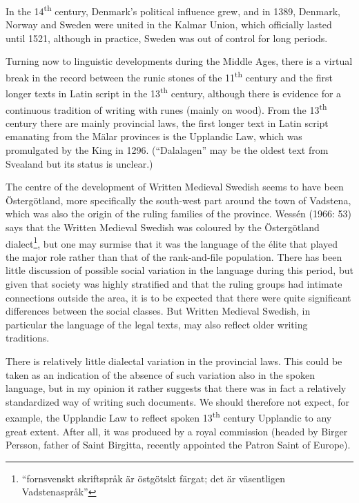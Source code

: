 In the 14\textsuperscript{th} century, Denmark’s political influence grew, and in 1389, Denmark, Norway and Sweden were united in the Kalmar Union, which officially lasted until 1521, although in practice, Sweden was out of control for long periods. 

Turning now to linguistic developments during the Middle Ages, there is a virtual break in the record between the runic stones of the 11\textsuperscript{th} century and the first longer texts in Latin script in the 13\textsuperscript{th} century, although there is evidence for a continuous tradition of writing with runes (mainly on wood). From the 13\textsuperscript{th} century there are mainly provincial laws, the first longer text in Latin script emanating from the Mälar provinces is the Upplandic Law, which was promulgated by the King in 1296. (“Dalalagen” may be the oldest text from Svealand but its status is unclear.) 

The centre of the development of Written Medieval Swedish seems to have been Östergötland, more specifically the south-west part around the town of Vadstena, which was also the origin of the ruling families of the province. Wessén (1966: 53) says that the Written Medieval Swedish was coloured by the Östergötland dialect\footnote{ “fornsvenskt skriftspråk är östgötskt färgat; det är väsentligen Vadstenaspråk” }, but one may surmise that it was the language of the élite that played the major role rather than that of the rank-and-file population. There has been little discussion of possible social variation in the language during this period, but given that society was highly stratified and that the ruling groups had intimate connections outside the area, it is to be expected that there were quite significant differences between the social classes. But Written Medieval Swedish, in particular the language of the legal texts, may also reflect older writing traditions.

There is relatively little dialectal variation in the provincial laws. This could be taken as an indication of the absence of such variation also in the spoken language, but in my opinion it rather suggests that there was in fact a relatively standardized way of writing such documents. We should therefore not expect, for example, the Upplandic Law to reflect spoken 13\textsuperscript{th} century Upplandic to any great extent. After all, it was produced by a royal commission (headed by Birger Persson, father of Saint Birgitta, recently appointed the Patron Saint of Europe). 

